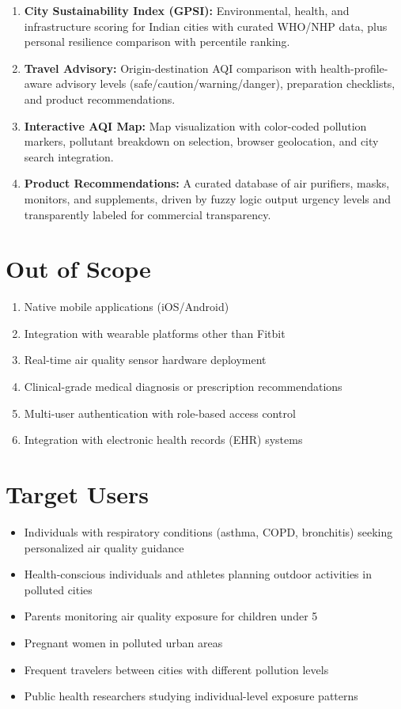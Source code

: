 \documentclass[12pt,a4paper]{report}
\begin{document}
\begin{enumerate}[leftmargin=*]
  \item \textbf{City Sustainability Index (GPSI):} Environmental, health, and infrastructure scoring for Indian cities with curated WHO/NHP data, plus personal resilience comparison with percentile ranking.

  \item \textbf{Travel Advisory:} Origin-destination AQI comparison with health-profile-aware advisory levels (safe/caution/warning/danger), preparation checklists, and product recommendations.

  \item \textbf{Interactive AQI Map:} Map visualization with color-coded pollution markers, pollutant breakdown on selection, browser geolocation, and city search integration.

  \item \textbf{Product Recommendations:} A curated database of air purifiers, masks, monitors, and supplements, driven by fuzzy logic output urgency levels and transparently labeled for commercial transparency.
\end{enumerate}

\section{Out of Scope}

\begin{enumerate}[leftmargin=*]
  \item Native mobile applications (iOS/Android)
  \item Integration with wearable platforms other than Fitbit
  \item Real-time air quality sensor hardware deployment
  \item Clinical-grade medical diagnosis or prescription recommendations
  \item Multi-user authentication with role-based access control
  \item Integration with electronic health records (EHR) systems
\end{enumerate}

\section{Target Users}

\begin{itemize}[leftmargin=*]
  \item Individuals with respiratory conditions (asthma, COPD, bronchitis) seeking personalized air quality guidance
  \item Health-conscious individuals and athletes planning outdoor activities in polluted cities
  \item Parents monitoring air quality exposure for children under 5
  \item Pregnant women in polluted urban areas
  \item Frequent travelers between cities with different pollution levels
  \item Public health researchers studying individual-level exposure patterns
\end{itemize}
\end{document}
